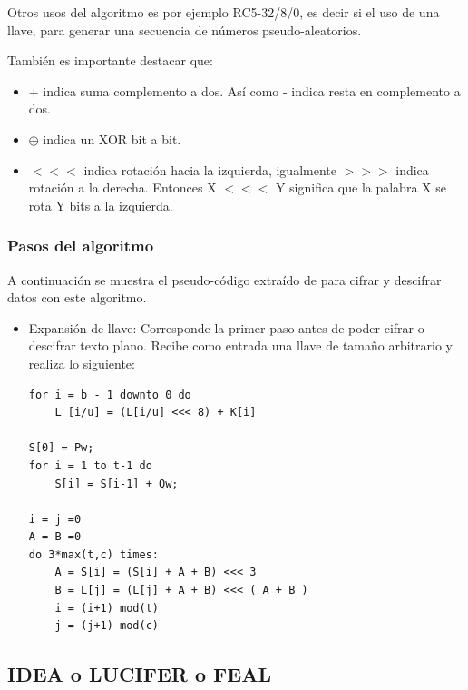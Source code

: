 Otros usos del algoritmo es por ejemplo \citep{rivest} RC5-32/8/0, es decir si el uso de una llave, para generar una secuencia de números pseudo-aleatorios.


También es importante destacar que:
\begin{itemize}
\item + indica suma complemento a dos. Así como - indica resta en complemento a dos.
\item $\oplus$ indica un XOR bit a bit.
\item $<<<$ indica rotación hacia la izquierda, igualmente $>>>$ indica rotación a la derecha. Entonces X $<<<$ Y significa que la palabra X se rota Y bits a la izquierda.
\end{itemize}

\subsubsection{Pasos del algoritmo}
A continuación se muestra el pseudo-código extraído de \cite{rivest} para cifrar y descifrar datos con este algoritmo. 
\begin{itemize}
\item Expansión de llave: Corresponde la primer paso antes de poder cifrar o descifrar texto plano. Recibe como entrada una llave de tamaño arbitrario y realiza lo siguiente:
\begin{lstlisting}
for i = b - 1 downto 0 do
	L [i/u] = (L[i/u] <<< 8) + K[i]
	
S[0] = Pw;
for i = 1 to t-1 do
	S[i] = S[i-1] + Qw;
	
i = j =0
A = B =0
do 3*max(t,c) times:
	A = S[i] = (S[i] + A + B) <<< 3
	B = L[j] = (L[j] + A + B) <<< ( A + B )
	i = (i+1) mod(t)
	j = (j+1) mod(c)
\end{lstlisting}
\end{itemize}




\subsection{IDEA o LUCIFER o FEAL}


